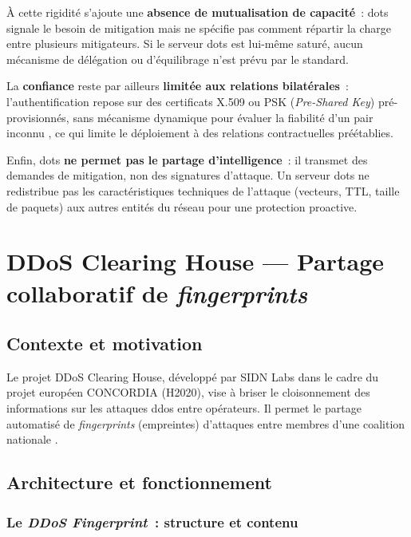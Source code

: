 À cette rigidité s'ajoute une \textbf{absence de mutualisation de capacité}~: \gls{dots} signale le besoin de mitigation mais ne spécifie pas comment répartir la charge entre plusieurs mitigateurs. Si le serveur \gls{dots} est lui-même saturé, aucun mécanisme de délégation ou d'équilibrage n'est prévu par le standard.

La \textbf{confiance} reste par ailleurs \textbf{limitée aux relations bilatérales}~: l'authentification repose sur des certificats X.509 ou PSK (\textit{Pre-Shared Key}) pré-provisionnés, sans mécanisme dynamique pour évaluer la fiabilité d'un pair inconnu \parencite{mortensen2019dots}, ce qui limite le déploiement à des relations contractuelles préétablies.

Enfin, \gls{dots} \textbf{ne permet pas le partage d'intelligence}~: il transmet des demandes de mitigation, non des signatures d'attaque. Un serveur \gls{dots} ne redistribue pas les caractéristiques techniques de l'attaque (vecteurs, TTL, taille de paquets) aux autres entités du réseau pour une protection proactive.

\section{DDoS Clearing House --- Partage collaboratif de \textit{fingerprints}}
\label{sec:clearinghouse}

\subsection{Contexte et motivation}

Le projet DDoS Clearing House, développé par SIDN Labs dans le cadre du projet européen CONCORDIA (H2020), vise à briser le cloisonnement des informations sur les attaques \gls{ddos} entre opérateurs. Il permet le partage automatisé de \textit{fingerprints} (empreintes) d'attaques entre membres d'une coalition nationale \parencite{sidnlabs2021clearinghouse}.

\subsection{Architecture et fonctionnement}

\subsubsection{Le \textit{DDoS Fingerprint}~: structure et contenu}

